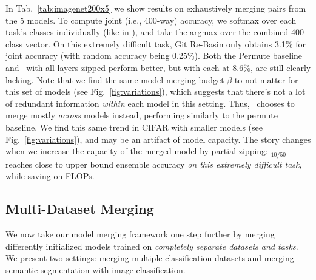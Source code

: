 In Tab.~\ref{tab:imagenet200x5} we show results on exhaustively merging pairs from the 5 models. To compute joint (i.e., 400-way) accuracy, we softmax over each task's classes individually (like in \citet{ahn2021ss}), and take the argmax over the combined 400 class vector. On this extremely difficult task, Git Re-Basin only obtains 3.1\% for joint accuracy (with random accuracy being 0.25\%).
Both the Permute baseline and \name{}\ with all layers zipped perform better, but with each at 8.6\%, are still clearly lacking.
Note that we find the same-model merging budget $\beta$ to not matter for this set of models (see Fig.~\ref{fig:variations}), which suggests that there's not a lot of redundant information \textit{within} each model 
in
this setting. Thus, \name{}\ chooses to merge mostly \textit{across} models instead, performing similarly to the permute baseline. We find this same trend in CIFAR with smaller models (see Fig.~\ref{fig:variations}), 
and
may be an artifact of model capacity. 
The story changes when we increase the capacity of the merged model by partial zipping: \name{}$_{10/50}$ 
reaches
close to upper bound ensemble accuracy \textit{on this extremely difficult task}, while saving on FLOPs.

\vspace{-0.5em}
\subsection{Multi-Dataset Merging}
We now take our model merging framework one step further by merging differently initialized models trained on \textit{completely separate datasets and tasks}. We present two settings: merging multiple classification datasets and merging semantic segmentation with image classification.




